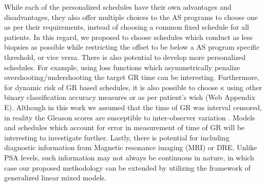 While each of the personalized schedules have their own advantages and disadvantages, they also offer multiple choices to the AS programs to choose one as per their requirements, instead of choosing a common fixed schedule for all patients. In this regard, we proposed to choose schedules which conduct as less biopsies as possible while restricting the offset to be below a AS program specific threshold, or vice versa. There is also potential to develop more personalized schedules. For example, using loss functions which asymmetrically penalize overshooting/undershooting the target GR time can be interesting. Furthermore, for dynamic risk of GR based schedules, it is also possible to choose $\kappa$ using other binary classification accuracy measures or as per patient's wish (Web Appendix E). Although in this work we assumed that the time of GR was interval censored, in reality the Gleason scores are susceptible to inter-observer variation \citep{Gleason_interobs_var}. Models and schedules which account for error in measurement of time of GR will be interesting to investigate further. Lastly, there is potential for including diagnostic information from Magnetic resonance imaging (MRI) or DRE. Unlike PSA levels, such information may not always be continuous in nature, in which case our proposed methodology can be extended by utilizing the framework of generalized linear mixed models.